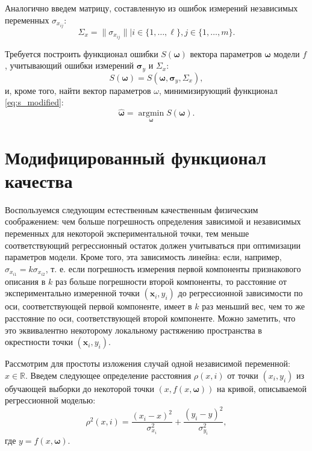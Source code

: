 \documentclass[tikz,11pt,a4paper]{article}
\newcommand{\bomega}{\boldsymbol{\omega}}
\begin{document}
Аналогично введем матрицу, составленную из ошибок измерений независимых переменных
$\sigma_{x_{ij}}$:
\[
  \Sigma_x = \| \sigma_{x_{ij}} \| | i \in \{ 1, \dots, \ell \}, j \in \{ 1, \dots, m \}.
\]

Требуется построить функционал ошибки $S(\bomega)$ вектора параметров
$\bomega$ модели $f$, учитывающий ошибки измерений $\boldsymbol{\sigma}_y$ и
$\Sigma_x$:
\begin{equation}
  S(\bomega) = S(\bomega, \boldsymbol{\sigma}_y, \Sigma_x),
  \label{eq:s_modified}
\end{equation}
и, кроме того, найти вектор параметров $\omega$, минимизирующий функционал
\eqref{eq:s_modified}:
\begin{equation}
  \hat{\bomega} = \mathop{\arg \min}\limits_{\bomega} S(\bomega).
\end{equation}

\section{Модифицированный функционал качества}

Воспользуемся следующим естественным качественным физическим соображением:
чем больше погрешность определения зависимой и независимых переменных
для некоторой экспериментальной точки, тем меньше соответствующий
регрессионный остаток должен учитываться при оптимизации параметров модели.
Кроме того, эта зависимость линейна: если, например, $\sigma_{x_{i1}} = k \sigma_{x_{i2}}$,
т. е. если погрешность измерения первой компоненты признакового описания в $k$
раз больше погрешности второй компоненты, то расстояние от экспериментально
измеренной точки $(\mathbf{x}_i, y_i)$ до регрессионной зависимости по оси,
соответствующей первой компоненте, имеет в $k$ раз меньший вес, чем то же
расстояние по оси, соответствующей второй компоненте. Можно заметить, что
это эквивалентно некоторому локальному растяжению пространства в окрестности
точки $(\mathbf{x}_i, y_i)$.

Рассмотрим для простоты изложения случай одной независимой переменной:
$x \in \mathbb{R}$. Введем следующее определение расстояния $\rho(x, i)$
от точки $(x_i, y_i)$ из обучающей выборки до некоторой точки
$(x, f(x, \bomega))$ на кривой, описываемой регрессионной моделью:
\begin{equation}
  \rho^2(x, i) = \frac{(x_i - x)^2}{\sigma_{x_i}^2} + \frac{(y_i - y)^2}{\sigma_{y_i}^2},
  \label{eq:dist0}
\end{equation}
где $y = f(x, \bomega)$.
\end{document}
